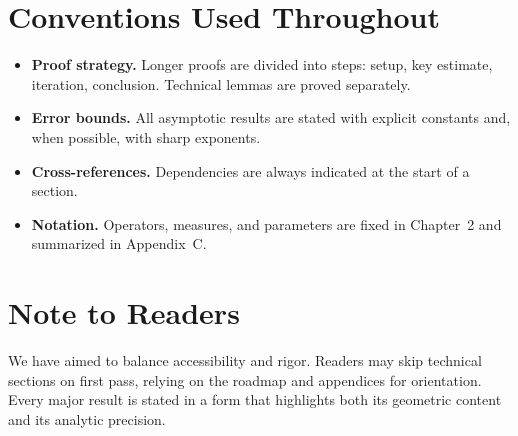 \section*{Conventions Used Throughout}

\begin{itemize}
    \item \textbf{Proof strategy.} Longer proofs are divided into steps: 
    setup, key estimate, iteration, conclusion. Technical lemmas are proved separately.
    \item \textbf{Error bounds.} All asymptotic results are stated with explicit constants 
    and, when possible, with sharp exponents.
    \item \textbf{Cross-references.} Dependencies are always indicated at the start of a section.
    \item \textbf{Notation.} Operators, measures, and parameters are fixed in Chapter~2 
    and summarized in Appendix~C.
\end{itemize}

\section*{Note to Readers}

We have aimed to balance accessibility and rigor. Readers may skip technical sections 
on first pass, relying on the roadmap and appendices for orientation. 
Every major result is stated in a form that highlights both its geometric content 
and its analytic precision.
